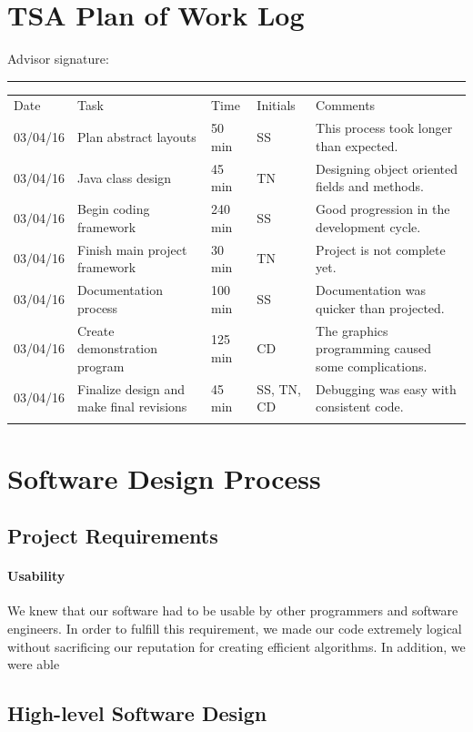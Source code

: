 \documentclass[letterpaper, 10pt]{article}
\begin{document}
\section{TSA Plan of Work Log}
	
	Advisor signature:
	\rule{10cm}{0.4pt}
	\footnotesize
	\begin{center}
	\begin{tabular} { l || p{1.25 in}| l| l|p{2.50in}}
		Date & Task & Time & Initials & Comments \\
		03/04/16 & Plan abstract layouts & 50 min & SS & This process took longer than expected. \\
		03/04/16 & Java class design & 45 min & TN & Designing object oriented fields and methods.\\
		03/04/16 & Begin coding framework & 240 min & SS & Good progression in the development cycle.\\
		03/04/16 & Finish main project framework & 30 min & TN & Project is not complete yet.\\
		03/04/16 & Documentation process & 100 min & SS & Documentation was quicker than projected.\\
		03/04/16 & Create demonstration program & 125 min & CD & The graphics programming caused some complications.\\
		03/04/16 & Finalize design and make final revisions & 45 min & SS, TN, CD & Debugging was easy with consistent code.\\
		
		
	\normalsize
	\end{tabular}
	\end{center}
\cleardoublepage
\section{Software Design Process}
	\subsection{Project Requirements}
		\paragraph{Usability} We knew that our software had to be usable by other programmers and software engineers. In order to fulfill this requirement, we made our code extremely logical without sacrificing our reputation for creating efficient algorithms. In addition, we were able 
	\subsection{High-level Software Design}
\end{document}
